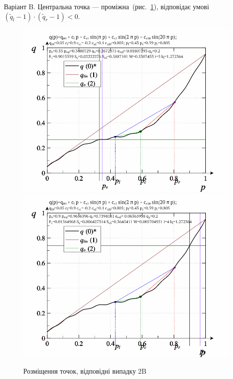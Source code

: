 Варіант B.\label{atu:d:p_eql_2B} %
%
Центральна точка --- проміжна~(рис.~\ref{atu:f:pq_2B}),
відповідає умові
$ ( \tilde{q}_l -1 ) \cdot ( \tilde{q}_r -1 ) < 0 $.

\begin{figure}[htb!]
  \begin{center}
    \includegraphics[width=49\TW]{p/pq_sin-p_pq_po=033.png}
    \hfill
    \includegraphics[width=49\TW]{p/pq_sin-p_pq_po=090.png}
  \end{center}
  \caption{Розміщення точок, відповідні випадку 2B}
  \label{atu:f:pq_2B}
\end{figure}

